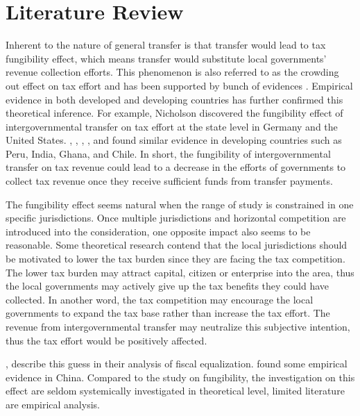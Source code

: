 \documentclass[man]{apa7}
\begin{document}
\section{Literature Review}
Inherent to the nature of general transfer is that transfer would lead to tax fungibility effect, which means transfer would substitute local governments' revenue collection efforts. This phenomenon is also referred to as the crowding out effect on tax effort and has been supported by bunch of evidences \parencite{inman1988federal,peterson1997decentralization,litvack1998rethinking}. Empirical evidence in both developed and developing countries has further confirmed this theoretical inference. For example, Nicholson \cite{nicholson2008fiscal} discovered the fungibility effect of intergovernmental transfer on tax effort at the state level in Germany and the United States.  \textcite{2002A}, \textcite{aragon2005intergovernmental}, \textcite{panda2009central}, \textcite{mogues2012external}, and \textcite{bravo2013income} found similar evidence in developing countries such as Peru, India, Ghana, and Chile. In short, the fungibility of intergovernmental transfer on tax revenue could lead to a decrease in the efforts of governments to collect tax revenue once they receive sufficient funds from transfer payments.

The fungibility effect seems natural when the range of study is constrained in one specific jurisdictions. Once multiple jurisdictions and horizontal competition are introduced into the consideration, one opposite impact also seems to be reasonable. Some theoretical research contend that the local jurisdictions should be motivated to lower the tax burden since they are facing the tax competition. The lower tax burden may attract capital, citizen or enterprise into the area, thus the local governments may actively give up the tax benefits they could have collected. In another word, the tax competition may encourage the local governments to expand the tax base rather than increase the tax effort. The revenue from intergovernmental transfer may neutralize this subjective intention, thus the tax effort would be positively affected.

\textcite{2010Theefficiency}, \textcite{2006Theincentive} describe this guess in their analysis of fiscal equalization. \textcite{2011Intergovernmental}
found some empirical evidence in China. Compared to the study on fungibility, the investigation on this effect are seldom systemically investigated in theoretical level, limited literature are empirical analysis.
\end{document}
